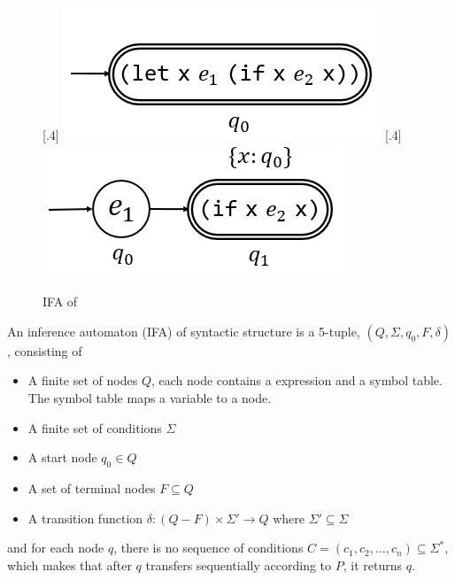 \begin{figure}[t]
\centering
{}[.4\linewidth]{
    \includegraphics[scale=0.25]{images/ifa/ifa-and-1.png}
}
[.4\linewidth]{
    \includegraphics[scale=0.25]{images/ifa/ifa-and-2.png}
}
\caption{IFA of }
\label{fig:ifa-and}
\end{figure}


\begin{Def}

An inference automaton (IFA) of syntactic structure  is a 5-tuple, $(Q, \Sigma, q_0, F, \delta)$, consisting of

\begin{itemize}
    \item A finite set of nodes $Q$, each node contains a expression and a symbol table. The symbol table maps a variable to a node.
    \item A finite set of conditions $\Sigma$
    \item A start node $q_0 \in Q$
    \item A set of terminal nodes $F \subseteq Q$
    \item A transition function $\delta: (Q-F) \times \Sigma' \to Q$ where $\Sigma' \subseteq \Sigma$
\end{itemize}

and for each node $q$, there is no sequence of conditions $C = (c_1,c_2,\ldots,c_n)\subseteq \Sigma^*$, which makes that after $q$ transfers sequentially according to $P$, it returns $q$.

\end{Def}

